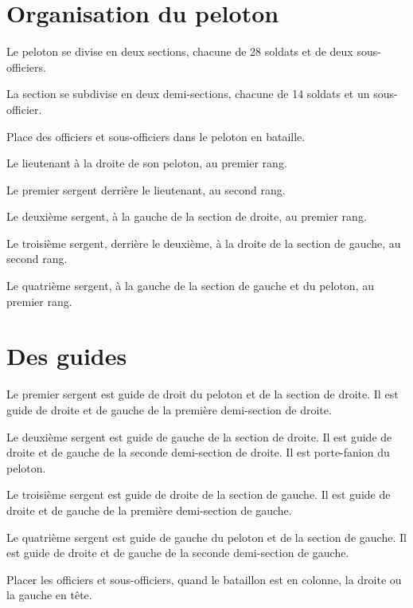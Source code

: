 \documentclass[french,twoside]{book} %
\begin{document}
\section[{Organisation du peloton}]{Organisation du peloton}\renewcommand{\leftmark}{Organisation du peloton}

\noindent Le peloton se divise en deux sections, chacune de 28 soldats et de deux sous-officiers.\par
La section se subdivise en deux demi-sections, chacune de 14 soldats et un sous-officier.\par
Place des officiers et sous-officiers dans le peloton en bataille.\par
Le lieutenant à la droite de son peloton, au premier rang.\par
Le premier sergent derrière le lieutenant, au second rang.\par
Le deuxième sergent, à la gauche de la section de droite, au premier rang.\par
Le troisième sergent, derrière le deuxième, à la droite de la section de gauche, au second rang.\par
Le quatrième sergent, à la gauche de la section de gauche et du peloton, au premier rang.
\section[{Des guides}]{Des guides}\renewcommand{\leftmark}{Des guides}

\noindent Le premier sergent est guide de droit du peloton et de la section de droite. Il est guide de droite et de gauche de la première demi-section de droite.\par
Le deuxième sergent est guide de gauche de la section de droite. Il est guide de droite et de gauche de la seconde demi-section de droite. Il est porte-fanion du peloton.\par
Le troisième sergent est guide de droite de la section de gauche. Il est guide de droite et de gauche de la première demi-section de gauche.\par
Le quatrième sergent est guide de gauche du peloton et de la section de gauche. Il est guide de droite et de gauche de la seconde demi-section de gauche.\par
Placer les officiers et sous-officiers, quand le bataillon est en colonne, la droite ou la gauche en tête.\par
\end{document}

